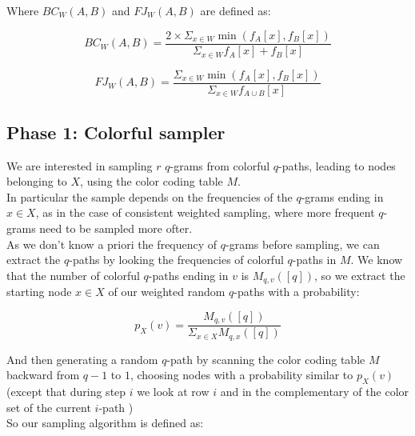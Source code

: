 Where $BC_{W}(A,B)$ and $FJ_{W}(A,B)$ are defined as:

\begin{equation}\label{bc-w}
	BC_{W}(A,B) = \frac{ 2 \times \Sigma_{x \in W} \min(f_{A}[x], f_{B}[x]) }{ \Sigma_{x \in W} f_{A}[x] + f_{B}[x] }
\end{equation}

\begin{equation}\label{fj-w}
	FJ_{W}(A,B) = \frac{ \Sigma_{x \in W} \min(f_{A}[x], f_{B}[x]) }{ \Sigma_{x \in W} f_{A \cup B}[x] }
\end{equation}

\subsection*{Phase 1: Colorful sampler}

We are interested in sampling $r$ $q$-grams from colorful $q$-paths, leading to nodes belonging to $X$, using the color coding table $M$.\\

In particular the sample depends on the frequencies of the $q$-grams ending in $x \in X$,
as in the case of consistent weighted sampling, where more frequent $q$-grams need to be sampled more ofter.\\

As we don't know a priori the frequency of $q$-grams before sampling, 
we can extract the $q$-paths by looking the frequencies of colorful $q$-paths in $M$. 
We know that the number of colorful $q$-paths ending in $v$ is $M_{q,v}([q])$, 
so we extract the starting node $x \in X$ of our weighted random $q$-paths with a probability:

\begin{equation}
	p_{X}(v) = \frac{ M_{q,v}([q]) }{ \Sigma_{x \in X}{M_{q, x}([q])} }
\end{equation}

And then generating a random $q$-path by scanning the color coding table $M$ 
backward from $q-1$ to $1$, choosing nodes with a probability similar to $p_{X}(v)$
(except that during step $i$ we look at row $i$ and in the complementary of the color set of the current $i$-path )\\

So our sampling algorithm is defined as:
\clearpage

